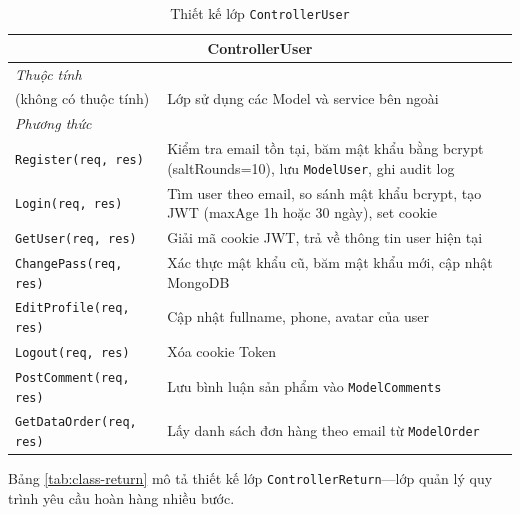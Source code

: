 \documentclass[../DoAn.tex]{subfiles}
\begin{document}
\begin{table}[H]
\centering
\caption{Thiết kế lớp \texttt{ControllerUser}}
\label{tab:class-user}
\scriptsize
\begin{tabular}{|p{4cm}|p{9cm}|}
\hline
\multicolumn{2}{|c|}{\textbf{ControllerUser}} \\
\hline
\multicolumn{2}{|l|}{\textit{Thuộc tính}} \\
\hline
(không có thuộc tính) & Lớp sử dụng các Model và service bên ngoài \\
\hline
\multicolumn{2}{|l|}{\textit{Phương thức}} \\
\hline
\texttt{Register(req, res)} & Kiểm tra email tồn tại, băm mật khẩu bằng bcrypt (saltRounds=10), lưu \texttt{ModelUser}, ghi audit log \\
\hline
\texttt{Login(req, res)} & Tìm user theo email, so sánh mật khẩu bcrypt, tạo JWT (maxAge 1h hoặc 30 ngày), set cookie \\
\hline
\texttt{GetUser(req, res)} & Giải mã cookie JWT, trả về thông tin user hiện tại \\
\hline
\texttt{ChangePass(req, res)} & Xác thực mật khẩu cũ, băm mật khẩu mới, cập nhật MongoDB \\
\hline
\texttt{EditProfile(req, res)} & Cập nhật fullname, phone, avatar của user \\
\hline
\texttt{Logout(req, res)} & Xóa cookie Token \\
\hline
\texttt{PostComment(req, res)} & Lưu bình luận sản phẩm vào \texttt{ModelComments} \\
\hline
\texttt{GetDataOrder(req, res)} & Lấy danh sách đơn hàng theo email từ \texttt{ModelOrder} \\
\hline
\end{tabular}
\end{table}

Bảng \ref{tab:class-return} mô tả thiết kế lớp \texttt{ControllerReturn}---lớp
quản lý quy trình yêu cầu hoàn hàng nhiều bước.
\end{document}
